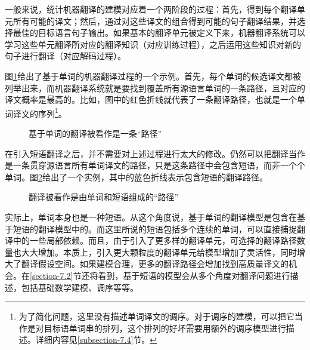 \parinterval 一般来说，统计机器翻译的建模对应着一个两阶段的过程：首先，得到每个翻译单元所有可能的译文；然后，通过对这些译文的组合得到可能的句子翻译结果，并选择最佳的目标语言句子输出。如果基本的翻译单元被定义下来，机器翻译系统可以学习这些单元翻译所对应的翻译知识（对应训练过程），之后运用这些知识对新的句子进行翻译（对应解码过程）。

\parinterval 图\ref{fig:7-4}给出了基于单词的机器翻译过程的一个示例。首先，每个单词的候选译文都被列举出来，而机器翻译系统就是要找到覆盖所有源语言单词的一条路径，且对应的译文概率是最高的。比如，图中的红色折线就代表了一条翻译路径，也就是一个单词译文的序列\footnote[1]{为了简化问题，这里没有描述单词译文的调序。对于调序的建模，可以把它当作是对目标语单词串的排列，这个排列的好坏需要用额外的调序模型进行描述。详细内容见\ref{subsection-7.4}节。}。

\begin{figure}[htp]
\centering

\caption{基于单词的翻译被看作是一条“路径”}
\label{fig:7-4}
\end{figure}

\parinterval 在引入短语翻译之后，并不需要对上述过程进行太大的修改。仍然可以把翻译当作是一条贯穿源语言所有单词译文的路径，只是这条路径中会包含短语，而非一个个单词。图\ref{fig:7-5}给出了一个实例，其中的蓝色折线表示包含短语的翻译路径。

\begin{figure}[htp]
\centering

\caption{翻译被看作是由单词和短语组成的“路径”}
\label{fig:7-5}
\end{figure}

\parinterval 实际上，单词本身也是一种短语。从这个角度说，基于单词的翻译模型是包含在基于短语的翻译模型中的。而这里所说的短语包括多个连续的单词，可以直接捕捉翻译中的一些局部依赖。而且，由于引入了更多样的翻译单元，可选择的翻译路径数量也大大增加。本质上，引入更大颗粒度的翻译单元给模型增加了灵活性，同时增大了翻译假设空间。如果建模合理，更多的翻译路径会增加找到高质量译文的机会。在\ref{section-7.2}节还将看到，基于短语的模型会从多个角度对翻译问题进行描述，包括基础数学建模、调序等等。



